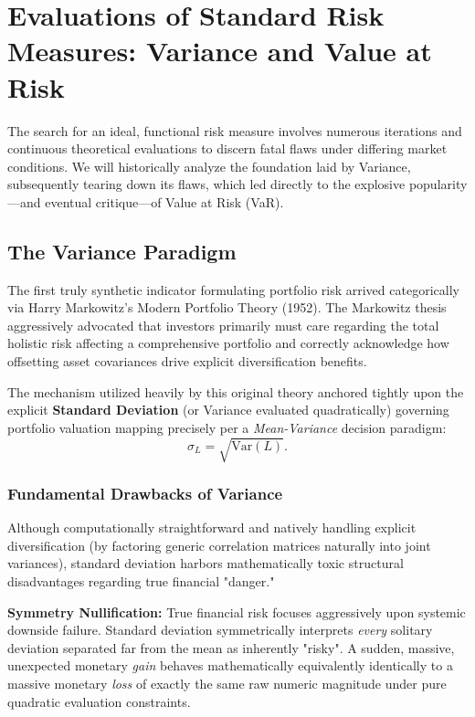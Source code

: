 \chapter{Evaluations of Standard Risk Measures: Variance and Value at Risk}

The search for an ideal, functional risk measure involves numerous iterations and continuous theoretical evaluations to discern fatal flaws under differing market conditions. We will historically analyze the foundation laid by Variance, subsequently tearing down its flaws, which led directly to the explosive popularity—and eventual critique—of Value at Risk (VaR).

\section{The Variance Paradigm}

The first truly synthetic indicator formulating portfolio risk arrived categorically via Harry Markowitz's Modern Portfolio Theory (1952). The Markowitz thesis aggressively advocated that investors primarily must care regarding the total holistic risk affecting a comprehensive portfolio and correctly acknowledge how offsetting asset covariances drive explicit diversification benefits. 

The mechanism utilized heavily by this original theory anchored tightly upon the explicit \textbf{Standard Deviation} (or Variance evaluated quadratically) governing portfolio valuation mapping precisely per a \textit{Mean-Variance} decision paradigm:
$$
\sigma_L = \sqrt{\text{Var}(L)}.
$$

\subsection{Fundamental Drawbacks of Variance}

Although computationally straightforward and natively handling explicit diversification (by factoring generic correlation matrices naturally into joint variances), standard deviation harbors mathematically toxic structural disadvantages regarding true financial "danger."

\textbf{Symmetry Nullification:} True financial risk focuses aggressively upon systemic downside failure. Standard deviation symmetrically interprets \textit{every} solitary deviation separated far from the mean as inherently "risky". A sudden, massive, unexpected monetary \textit{gain} behaves mathematically equivalently identically to a massive monetary \textit{loss} of exactly the same raw numeric magnitude under pure quadratic evaluation constraints.

